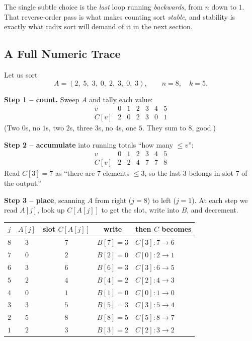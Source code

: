The single subtle choice is the \emph{last} loop running \emph{backwards},
from $n$ down to $1$. That reverse-order pass is what makes counting sort
\emph{stable}, and stability is exactly what radix sort will demand of it in
the next section.

\subsection{A Full Numeric Trace}

Let us sort
\[
A = (2,\; 5,\; 3,\; 0,\; 2,\; 3,\; 0,\; 3),\qquad n = 8,\quad k = 5.
\]

\textbf{Step 1 -- count.} Sweep $A$ and tally each value:
\[
\begin{array}{c|cccccc}
v      & 0 & 1 & 2 & 3 & 4 & 5\\\hline
C[v]   & 2 & 0 & 2 & 3 & 0 & 1
\end{array}
\]
(Two $0$s, no $1$s, two $2$s, three $3$s, no $4$s, one $5$. They sum to $8$,
good.)

\textbf{Step 2 -- accumulate} into running totals ``how many $\le v$'':
\[
\begin{array}{c|cccccc}
v      & 0 & 1 & 2 & 3 & 4 & 5\\\hline
C[v]   & 2 & 2 & 4 & 7 & 7 & 8
\end{array}
\]
Read $C[3] = 7$ as ``there are $7$ elements $\le 3$, so the last $3$ belongs in
slot $7$ of the output.''

\textbf{Step 3 -- place}, scanning $A$ from right ($j=8$) to left ($j=1$). At
each step we read $A[j]$, look up $C[A[j]]$ to get the slot, write into $B$, and
decrement.

\begin{center}
\begin{tabular}{c|c|c|c|l}
$j$ & $A[j]$ & slot $C[A[j]]$ & write & then $C$ becomes\\\hline
$8$ & $3$ & $7$ & $B[7]=3$ & $C[3]\!:7\!\to\!6$\\
$7$ & $0$ & $2$ & $B[2]=0$ & $C[0]\!:2\!\to\!1$\\
$6$ & $3$ & $6$ & $B[6]=3$ & $C[3]\!:6\!\to\!5$\\
$5$ & $2$ & $4$ & $B[4]=2$ & $C[2]\!:4\!\to\!3$\\
$4$ & $0$ & $1$ & $B[1]=0$ & $C[0]\!:1\!\to\!0$\\
$3$ & $3$ & $5$ & $B[5]=3$ & $C[3]\!:5\!\to\!4$\\
$2$ & $5$ & $8$ & $B[8]=5$ & $C[5]\!:8\!\to\!7$\\
$1$ & $2$ & $3$ & $B[3]=2$ & $C[2]\!:3\!\to\!2$\\
\end{tabular}
\end{center}

